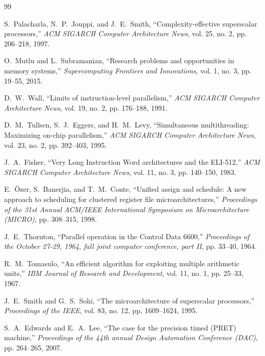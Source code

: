 \documentclass[twocolumn]{article}
\begin{document}
\begin{thebibliography}{99}

S.~Palacharla, N.~P.~Jouppi, and J.~E.~Smith,
``Complexity-effective superscalar processors,''
\emph{ACM SIGARCH Computer Architecture News}, vol. 25, no. 2, pp. 206--218, 1997.

O.~Mutlu and L.~Subramanian,
``Research problems and opportunities in memory systems,''
\emph{Supercomputing Frontiers and Innovations}, vol. 1, no. 3, pp. 19--55, 2015.

D.~W.~Wall,
``Limits of instruction-level parallelism,''
\emph{ACM SIGARCH Computer Architecture News}, vol. 19, no. 2, pp. 176--188, 1991.

D.~M.~Tullsen, S.~J.~Eggers, and H.~M.~Levy,
``Simultaneous multithreading: Maximizing on-chip parallelism,''
\emph{ACM SIGARCH Computer Architecture News}, vol. 23, no. 2, pp. 392--403, 1995.

J.~A.~Fisher,
``Very Long Instruction Word architectures and the ELI-512,''
\emph{ACM SIGARCH Computer Architecture News}, vol. 11, no. 3, pp. 140--150, 1983.

E.~Özer, S.~Banerjia, and T.~M.~Conte,
``Unified assign and schedule: A new approach to scheduling for clustered register file microarchitectures,''
\emph{Proceedings of the 31st Annual ACM/IEEE International Symposium on Microarchitecture (MICRO)}, pp. 308--315, 1998.

J.~E.~Thornton,
``Parallel operation in the Control Data 6600,''
\emph{Proceedings of the October 27-29, 1964, fall joint computer conference, part II}, pp. 33--40, 1964.

R.~M.~Tomasulo,
``An efficient algorithm for exploiting multiple arithmetic units,''
\emph{IBM Journal of Research and Development}, vol. 11, no. 1, pp. 25--33, 1967.

J.~E.~Smith and G.~S.~Sohi,
``The microarchitecture of superscalar processors,''
\emph{Proceedings of the IEEE}, vol. 83, no. 12, pp. 1609--1624, 1995.

S.~A.~Edwards and E.~A.~Lee,
``The case for the precision timed (PRET) machine,''
\emph{Proceedings of the 44th annual Design Automation Conference (DAC)}, pp. 264--265, 2007.


\end{thebibliography}
\end{document}
